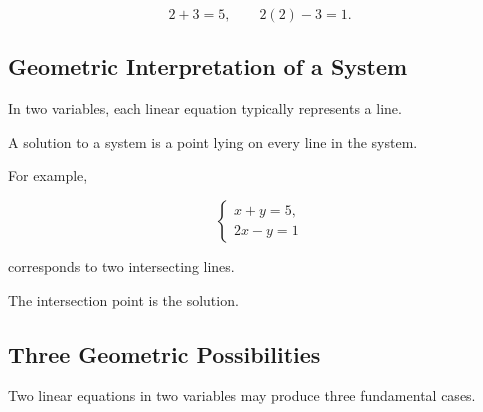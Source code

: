 \[ 2+3=5,\qquad 2(2)-3=1. \]

\subsection{Geometric Interpretation of a System}
\label{subsec:geometric-system}

In two variables, each linear equation typically represents a line.

A solution to a system is a point lying on every line in the system.

For example,

\[ \begin{cases}
x+y=5,\\
2x-y=1
\end{cases} \]

corresponds to two intersecting lines.

\begin{center}
\end{center}

The intersection point is the solution.

\subsection{Three Geometric Possibilities}
\label{subsec:three-system-cases}

Two linear equations in two variables may produce three fundamental cases.

